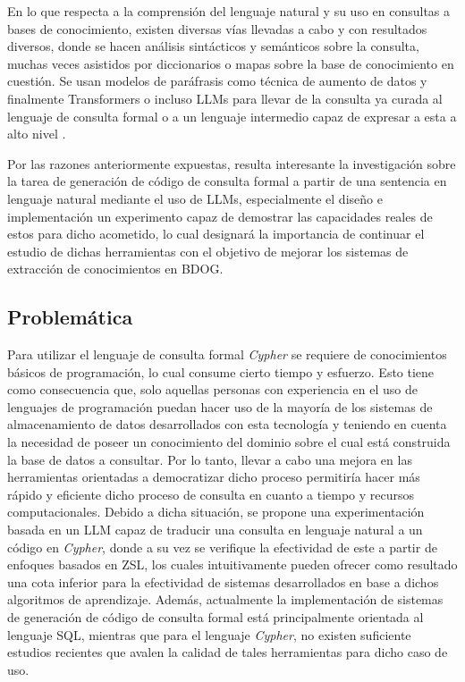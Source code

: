 En lo que respecta a la comprensión del lenguaje natural y su uso en consultas a bases de conocimiento, existen diversas vías llevadas a cabo y con resultados diversos, donde se hacen análisis sintácticos y semánticos sobre la consulta, muchas veces asistidos por diccionarios o mapas sobre la base de conocimiento en cuestión. Se usan modelos de paráfrasis como técnica de aumento de datos y finalmente Transformers \cite{transformers} o incluso LLMs para llevar de la consulta ya curada al lenguaje de consulta formal o a un lenguaje intermedio capaz de expresar a esta a alto nivel \cite{text2sql1} \cite{text2sql2} \cite{text2cypher1} \cite{text2cypher2}.

Por las razones anteriormente expuestas, resulta interesante la investigación sobre la tarea de generación de código de consulta formal a partir de una sentencia en lenguaje natural mediante el uso de LLMs, especialmente el diseño e implementación un experimento capaz de demostrar las capacidades reales de estos para dicho acometido, lo cual designará la importancia de continuar el estudio de dichas herramientas con el objetivo de mejorar los sistemas de extracción de conocimientos en BDOG.

\subsection*{Problemática}
Para utilizar el lenguaje de consulta formal \textit{Cypher} se requiere de conocimientos básicos de programación, lo cual consume cierto tiempo y esfuerzo. Esto tiene como consecuencia que, solo aquellas personas con experiencia en el uso de lenguajes de programación puedan hacer uso de la mayoría de los sistemas de almacenamiento de datos desarrollados con esta tecnología y teniendo en cuenta la necesidad de poseer un conocimiento del dominio sobre el cual está construida la base de datos a consultar. Por lo tanto, llevar a cabo una mejora en las herramientas orientadas a democratizar dicho proceso permitiría hacer más rápido y eficiente dicho proceso de consulta en cuanto a tiempo y recursos computacionales. Debido a dicha situación, se propone una experimentación basada en un LLM capaz de traducir una consulta en lenguaje natural a un código en \textit{Cypher}, donde a su vez se verifique la efectividad de este a partir de enfoques basados en ZSL, los cuales intuitivamente pueden ofrecer como resultado una cota inferior para la efectividad de sistemas desarrollados en base a dichos algoritmos de aprendizaje. Además, actualmente la implementación de sistemas de generación de código de consulta formal está principalmente orientada al lenguaje SQL, mientras que para el lenguaje \textit{Cypher}, no existen suficiente estudios recientes que avalen la calidad de tales herramientas para dicho caso de uso. 

